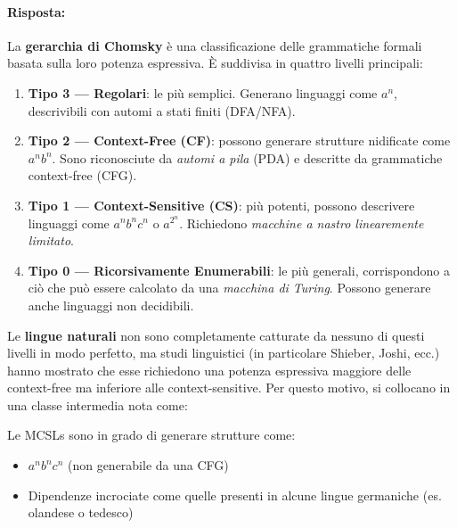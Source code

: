 
\paragraph{Risposta:}
La \textbf{gerarchia di Chomsky} è una classificazione delle grammatiche formali basata sulla loro potenza espressiva. È suddivisa in quattro livelli principali:

\begin{enumerate}
    \item \textbf{Tipo 3 — Regolari}: le più semplici. Generano linguaggi come $a^n$, descrivibili con automi a stati finiti (DFA/NFA).
    \item \textbf{Tipo 2 — Context-Free (CF)}: possono generare strutture nidificate come $a^n b^n$. Sono riconosciute da \textit{automi a pila} (PDA) e descritte da grammatiche context-free (CFG).
    \item \textbf{Tipo 1 — Context-Sensitive (CS)}: più potenti, possono descrivere linguaggi come $a^n b^n c^n$ o $a^{2^n}$. Richiedono \textit{macchine a nastro linearemente limitato}.
    \item \textbf{Tipo 0 — Ricorsivamente Enumerabili}: le più generali, corrispondono a ciò che può essere calcolato da una \textit{macchina di Turing}. Possono generare anche linguaggi non decidibili.
\end{enumerate}

\medskip

Le \textbf{lingue naturali} non sono completamente catturate da nessuno di questi livelli in modo perfetto, ma studi linguistici (in particolare Shieber, Joshi, ecc.) hanno mostrato che esse richiedono una potenza espressiva maggiore delle context-free ma inferiore alle context-sensitive. Per questo motivo, si collocano in una classe intermedia nota come:

\begin{center}
\end{center}

\medskip

Le MCSLs sono in grado di generare strutture come:

\begin{itemize}
    \item $a^n b^n c^n$ (non generabile da una CFG)
    \item Dipendenze incrociate come quelle presenti in alcune lingue germaniche (es. olandese o tedesco)
\end{itemize}

